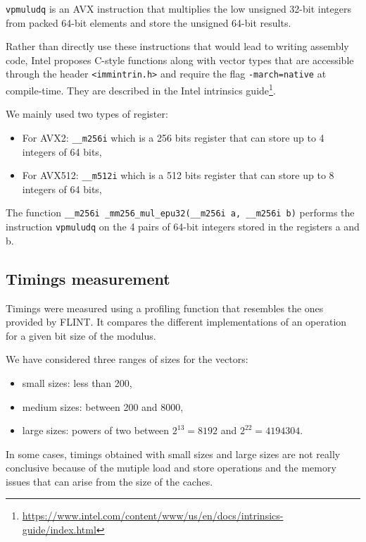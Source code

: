 \documentclass[a4paper]{article}
\begin{document}
\begin{example}
    \texttt{vpmuludq} is an AVX instruction that multiplies the low unsigned 32-bit integers from packed 64-bit elements
    and store the unsigned 64-bit results.
\end{example}

\bigskip
Rather than directly use these instructions that would lead to writing assembly code, Intel proposes C-style functions
along with vector types that are accessible through the header \texttt{<immintrin.h>} and require the flag \texttt{-march=native} at 
compile-time.
They are described in the Intel intrinsics guide\footnote{\url{https://www.intel.com/content/www/us/en/docs/intrinsics-guide/index.html}}.

\bigskip
We mainly used two types of register: 
\begin{itemize}
    \item For AVX2: \texttt{\_\_m256i} which is a 256 bits register that can store up to 4 integers of 64 bits,
    \item For AVX512: \texttt{\_\_m512i} which is a 512 bits register that can store up to 8 integers of 64 bits,
\end{itemize}


\begin{example}
    The function \texttt{\_\_m256i \_mm256\_mul\_epu32(\_\_m256i a, \_\_m256i b)} performs the instruction \texttt{vpmuludq}
    on the 4 pairs of 64-bit integers stored in the registers a and b.
\end{example}

\subsection{Timings measurement}

Timings were measured using a profiling function that resembles the ones provided by FLINT.
It compares the different implementations of an operation for a given bit size of the modulus.

\bigskip
We have considered three ranges of sizes for the vectors:
\begin{itemize}
    \item small sizes: less than 200, 
    \item medium sizes: between 200 and 8000,
    \item large sizes: powers of two between $2^{13}=8192$ and $2^{22}=4194304$.
\end{itemize}

In some cases, timings obtained with small sizes and large sizes are not really conclusive because of
the mutiple load and store operations and the memory issues that can arise from the size of the caches.
\end{document}
